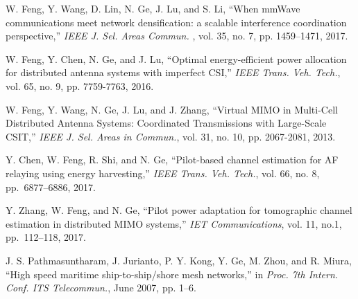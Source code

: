 \documentclass[journal]{IEEEtran}
\begin{document}
\begin{thebibliography}{10}
   
   
   
   
    W. Feng, Y. Wang, D. Lin, N. Ge, J. Lu, and S. Li, ``When mmWave communications meet network densification: a scalable interference coordination perspective,''
    \emph{IEEE J. Sel. Areas Commun. }, vol. 35, no. 7, pp. 1459--1471, 2017.
   
    W. Feng, Y. Chen, N. Ge, and J. Lu, ``Optimal energy-efficient power allocation for distributed antenna systems with imperfect CSI,''
    \emph{IEEE Trans. Veh. Tech.}, vol. 65, no. 9, pp. 7759-7763, 2016.
   
    W. Feng, Y. Wang, N. Ge, J. Lu, and J. Zhang, ``Virtual MIMO in Multi-Cell Distributed Antenna Systems: Coordinated Transmissions with Large-Scale CSIT,'' 
    \emph{IEEE J. Sel. Areas in Commun.}, vol. 31, no. 10, pp. 2067-2081, 2013.
   
    Y. Chen, W. Feng, R. Shi, and N. Ge, ``Pilot-based channel estimation for AF relaying using energy harvesting,'' \emph{IEEE Trans. Veh. Tech.}, vol. 66, no. 8, pp.~6877--6886, 2017. 
  
    Y. Zhang, W. Feng, and N. Ge, ``Pilot power adaptation for tomographic channel estimation in distributed MIMO systems,'' \emph{IET Communications}, vol. 11, no.1, pp.~112--118, 2017. 
   
    J. S. Pathmasuntharam, J. Jurianto, P. Y. Kong, Y. Ge, M. Zhou, and R. Miura, ``High speed maritime ship-to-ship/shore mesh networks,'' in
    \emph{Proc. 7th Intern. Conf. ITS Telecommun.}, June 2007, pp. 1--6.
   
   
   

\end{thebibliography}
\end{document}
